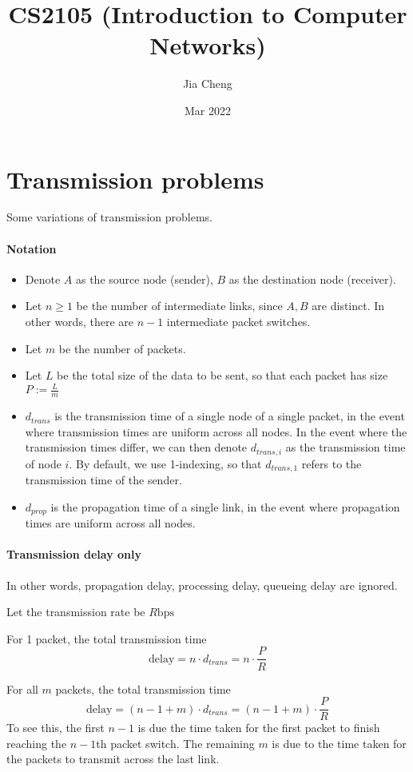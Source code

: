 \documentclass[a4paper]{article}
\title{CS2105 (Introduction to Computer Networks)}
\author{Jia Cheng}
\date{Mar 2022}
\begin{document}
\maketitle

\section{Transmission problems}
Some variations of transmission problems.

\paragraph{Notation}
\begin{itemize}
	\item Denote $A$ as the source node (sender), $B$ as the destination node (receiver).
	\item Let $n\geq 1$ be the number of intermediate links, since $A, B$ are distinct. In other words, there are $n-1$ intermediate packet switches.
	\item Let $m$ be the number of packets.
	\item Let $L$ be the total size of the data to be sent, so that each packet has size $P := \frac{L}{m}$
	\item $d_{trans}$ is the transmission time of a single node of a single packet, in the event where transmission times are uniform across all nodes. In the event where the transmission times differ, we can then denote $d_{trans, i}$ as the transmission time of node $i$. By default, we use 1-indexing, so that $d_{trans,1}$ refers to the transmission time of the sender.
	\item $d_{prop}$ is the propagation time of a single link, in the event where propagation times are uniform across all nodes.
\end{itemize}

\paragraph{Transmission delay only}
In other words, propagation delay, processing delay, queueing delay are ignored.

Let the transmission rate be $R \text{bps}$

For 1 packet, the total transmission time
\begin{equation}
	\text{delay} = n\cdot d_{trans} = n\cdot \frac{P}{R}
\end{equation}

For all $m$ packets, the total transmission time
\begin{equation}
	\text{delay} = (n-1+m)\cdot d_{trans} = (n - 1 + m)\cdot \frac{P}{R}
\end{equation}
To see this, the first $n-1$ is due the time taken for the first packet to finish reaching the $n-1$th packet switch. The remaining $m$ is due to the time taken for the packets to transmit across the last link.
\end{document}
